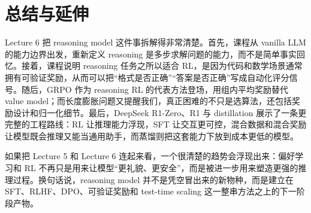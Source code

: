 \documentclass[a4paper]{article}
\begin{document}
\section{总结与延伸}
Lecture 6 把 reasoning model 这件事拆解得非常清楚。首先，课程从 vanilla LLM 的能力边界出发，重新定义 reasoning 是多步求解问题的能力，而不是简单事实回忆。接着，课程说明 reasoning 任务之所以适合 RL，是因为代码和数学场景通常拥有可验证奖励，从而可以把“格式是否正确”“答案是否正确”写成自动化评分信号。随后，GRPO 作为 reasoning RL 的代表方法登场，用组内平均奖励替代 value model；而长度膨胀问题又提醒我们，真正困难的不只是选算法，还包括奖励设计和归一化细节。最后，DeepSeek R1-Zero、R1 与 distillation 展示了一条更完整的工程路线：RL 让推理能力浮现，SFT 让交互更可控，混合数据和混合奖励让模型既会推理又能当通用助手，而蒸馏则把这套能力下放到成本更低的模型。

如果把 Lecture 5 和 Lecture 6 连起来看，一个很清楚的趋势会浮现出来：偏好学习和 RL 不再只是用来让模型“更礼貌、更安全”，而是被进一步用来塑造更强的推理过程。换句话说，reasoning model 并不是凭空冒出来的新物种，而是建立在 SFT、RLHF、DPO、可验证奖励和 test-time scaling 这一整串方法之上的下一阶段产物。
\end{document}
